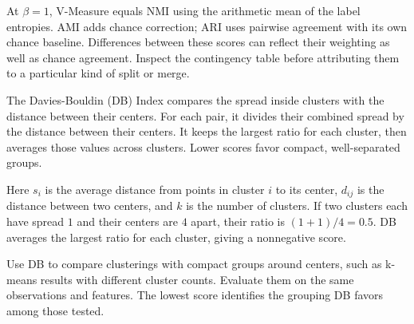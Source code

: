 \metricsecondary

At $\beta=1$, V-Measure equals NMI using the arithmetic mean of the label entropies. AMI adds chance correction; ARI uses pairwise agreement with its own chance baseline. Differences between these scores can reflect their weighting as well as chance agreement. Inspect the contingency table before attributing them to a particular kind of split or merge.

\metricend
\clearpage
\thispagestyle{clusteringstyle}
\label{sec:davies-bouldin-index}

The Davies-Bouldin (DB) Index compares the spread inside clusters with the distance between their centers. For each pair, it divides their combined spread by the distance between their centers. It keeps the largest ratio for each cluster, then averages those values across clusters. Lower scores favor compact, well-separated groups.

\begin{metricformula}
\end{metricformula}

Here $s_i$ is the average distance from points in cluster $i$ to its center, $d_{ij}$ is the distance between two centers, and $k$ is the number of clusters. If two clusters each have spread $1$ and their centers are $4$ apart, their ratio is $(1+1)/4=0.5$. DB averages the largest ratio for each cluster, giving a nonnegative score.


Use DB to compare clusterings with compact groups around centers, such as k-means results with different cluster counts. Evaluate them on the same observations and features. The lowest score identifies the grouping DB favors among those tested.


